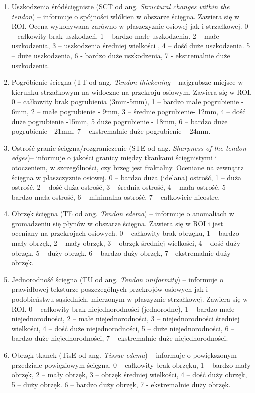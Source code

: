 \begin{enumerate}
	\item Uszkodzenia śródścięgniste (SCT od ang. \textit{Structural changes within the tendon}) -- informuje o spójności włókien w obszarze ścięgna. Zawiera się w ROI. Ocena wykonywana zarówno w płaszczyznie osiowej jak i strzałkowej. 0 – całkowity brak uszkodzeń, 1 – bardzo małe uszkodzenia. 2 – małe uszkodzenia, 3 – uszkodzenia średniej wielkości , 4 – dość duże uszkodzenia. 5 – duże uszkodzenia, 6 - bardzo duże uszkodzenia, 7 - ekstremalnie duże uszkodzenia.
	\item Pogróbienie ściegna (TT od ang. \textit{Tendon thickening} -- najgrubsze miejsce w kierunku strzałkowym na widoczne na przekroju osiowym. Zawiera się w ROI. 0 – całkowity brak pogrubienia (3mm-5mm), 1 – bardzo małe pogrubienie - 6mm, 2 – małe pogrubienie - 9mm, 3 – średnie pogrubienie- 12mm, 4 –  dość duże pogrubienie -15mm, 5 duże pogrubienie - 18mm, 6 – bardzo duże pogrubienie - 21mm, 7 – ekstremalnie duże pogrubienie – 24mm.
	\item Ostrość granic ścięgna/rozgraniczenie (STE od ang. \textit{Sharpness of the tendon edges})-- informuje o jakości granicy między tkankami ścięgnistymi i otoczeniem, w szczególności, czy brzeg jest fraktalny. Oceniane na zewnątrz ścięgna w płaszczyznie osiowej. 0 – bardzo duża (idelana) ostrość, 1 – duża ostrość, 2 – dość duża ostrość, 3 – średnia ostrość, 4 – mała ostrość, 5 – bardzo mała ostrość, 6 – minimalna ostrość, 7 – całkowicie nieostre.
	\item Obrzęk ścięgna (TE od ang. \textit{Tendon edema}) -- informuje o anomaliach w gromadzeniu się płynów w obszarze ścięgna. Zawiera się w ROI i jest oceniany na przekrojach osiowych. 0 – całkowity brak obrzęku, 1 – bardzo mały obrzęk, 2 – mały obrzęk, 3 – obrzęk średniej wielkości, 4 – dość duży obrzęk, 5 – duży obrzęk. 6 – bardzo duży obrzęk, 7 - ekstremalnie duży obrzęk.
	\item Jednorodność ścięgna (TU od ang. \textit{Tendon uniformity}) -- informuje o prawidłowej teksturze poszczególnych przekrojów osiowych jak i podobieństwu sąsiednich, mierzonym w płaszyznie strzałkowej. Zawiera się w ROI. 0 – całkowity brak niejednorodności (jednorodne), 1 – bardzo małe niejednorodności, 2 – małe niejednorodności, 3 – niejednorodności średniej wielkości, 4 – dość duże niejednorodności, 5 – duże niejednorodności, 6 – bardzo duże niejednorodności, 7 –  ekstremalnie duże niejednorodności. 
	\item Obrzęk tkanek (TisE od ang. \textit{Tissue edema}) -- informuje o powiększonym przedziale powięziowym ścięgna. 0  – całkowity brak obrzęku, 1 – bardzo mały obrzęk, 2 – mały obrzęk, 3 – obrzęk średniej wielkości, 4 – dość duży obrzęk, 5 – duży obrzęk. 6 – bardzo duży obrzęk, 7 - ekstremalnie duży obrzęk.
\end{enumerate}

